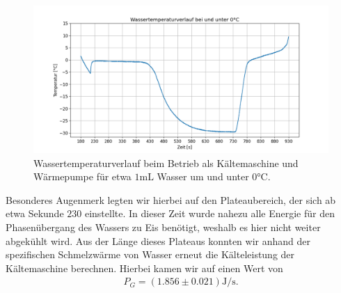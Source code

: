 \begin{figure}[H]
  \centering
  \includegraphics[width=.9\textwidth]{files/tempverlauf_unter0.png}
  \caption{Wassertemperaturverlauf beim Betrieb als Kältemaschine und Wärmepumpe für etwa $1 \si{\milli\liter}$ Wasser um und unter $0\si{\celsius}$.}
  \label{fig:tempverlauf_unter0}
\end{figure}

Besonderes Augenmerk legten wir hierbei auf den Plateaubereich, der sich ab etwa Sekunde $230$ einstellte. In dieser Zeit wurde nahezu alle Energie für den Phasenübergang des Wassers zu Eis benötigt, weshalb es hier nicht weiter abgekühlt wird. Aus der Länge dieses Plateaus konnten wir anhand der spezifischen Schmelzwärme von Wasser erneut die Kälteleistung der Kältemaschine berechnen. Hierbei kamen wir auf einen Wert von
\begin{align*}
  P_G = (1.856 \pm 0.021)\si{\joule\per\second}.
\end{align*}